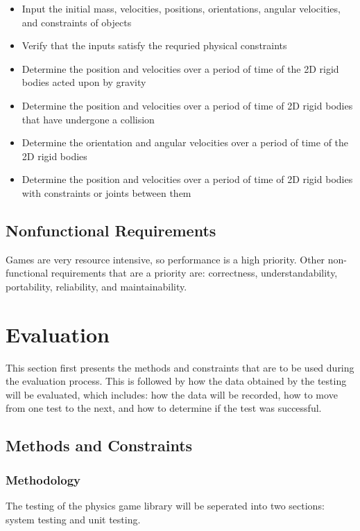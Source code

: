 \documentclass[12pt]{article}
\begin{document}
\noindent
\begin{itemize}
\item Input the initial mass, velocities, positions, orientations, angular velocities, and constraints of objects  
\item Verify that the inputs satisfy the requried physical constraints 
\item Determine the position and velocities over a period of time of the 2D rigid bodies acted upon by gravity
\item Determine the position and velocities over a period of time of 2D rigid bodies that have undergone a collision
\item Determine the orientation and angular velocities over a period of time of the 2D rigid bodies
\item Determine the position and velocities over a period of time of 2D rigid bodies with constraints or joints between them
\end{itemize} 

\subsection{Nonfunctional Requirements}
Games are very resource intensive, so performance is a high priority.
Other non-functional requirements that are a priority are: correctness,
understandability, portability, reliability, and maintainability. 


%
%

\section{Evaluation}
This section first presents the methods and constraints that are to be used during
the evaluation process. This is followed by how the data obtained by the testing will be 
evaluated, which includes: how the data will be recorded, how to move from one test
to the next, and how to determine if the test was successful. 

\subsection{Methods and Constraints} 

\subsubsection{Methodology} 
The testing of the physics game library will be seperated into two sections: system testing and unit testing.
\end{document}
